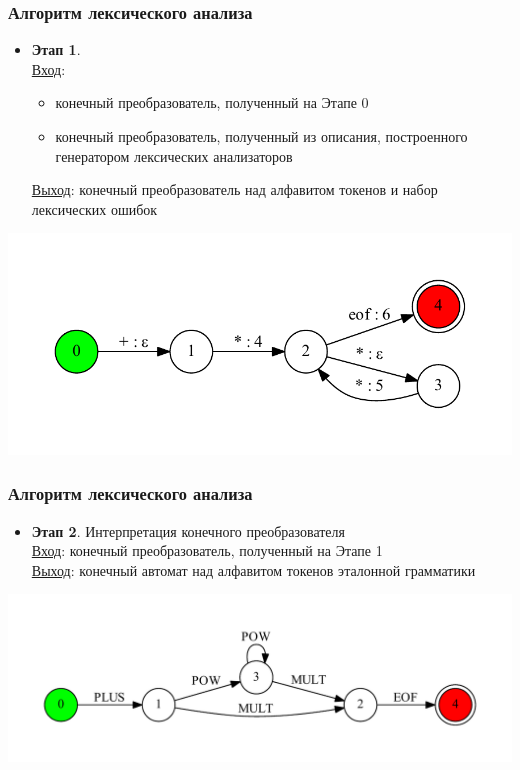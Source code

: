 \documentclass{beamer}
\begin{document}
\begin{frame}[fragile]
\transwipe[direction=90]
\frametitle{Алгоритм лексического анализа}
\begin{itemize}
\item \textbf{Этап 1}.\\
\underline{Вход}: \\ 
\begin{itemize}
\item конечный преобразователь, полученный на Этапе 0
\item конечный преобразователь, полученный из описания, построенного генератором лексических анализаторов
\end{itemize}
\underline{Выход}: конечный преобразователь над алфавитом токенов и набор лексических ошибок

\end{itemize}

\begin{center}
 \includegraphics[width=0.6\linewidth]{calc_ex_compose}
\end{center} 

\end{frame}

\begin{frame}[fragile]
\transwipe[direction=90]
\frametitle{Алгоритм лексического анализа}
\begin{itemize}
\item \textbf{Этап 2}. Интерпретация конечного преобразователя \\
\underline{Вход}: конечный преобразователь, полученный на Этапе 1 \\
\underline{Выход}: конечный автомат над алфавитом токенов эталонной грамматики \\
\end{itemize}

\begin{center}      
    \includegraphics[width=0.8\linewidth]{calc_ex_res}    
\end{center} 
\end{frame}
\end{document}
